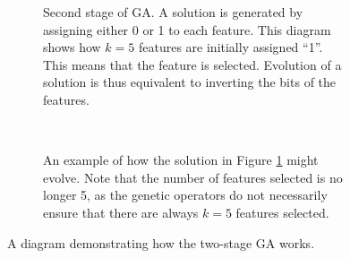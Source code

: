 \documentclass[12pt, twoside, a4paper]{report}
\begin{document}
\begin{figure}
\begin{subfigure}[b]{\textwidth}
\centering
{}
\caption{Second stage of GA. A solution is generated by assigning either 0 or 1 to each feature. This diagram shows how $k=5$ features are initially assigned ``1''. This means that the feature is selected. Evolution of a solution is thus equivalent to inverting the bits of the features.}
\label{bg:ga:twostage_b}
\end{subfigure} \\[2em]

\begin{subfigure}[b]{\textwidth}
\centering
{}
\caption{An example of how the solution in Figure \ref{bg:ga:twostage_b} might evolve. Note that the number of features selected is no longer 5, as the genetic operators do not necessarily ensure that there are always $k=5$ features selected.}
\label{bg:ga:twostage_c}
\end{subfigure}

\caption{A diagram demonstrating how the two-stage GA works.}
\label{bg:ga:twostage:diag}
\end{figure}
\end{document}
